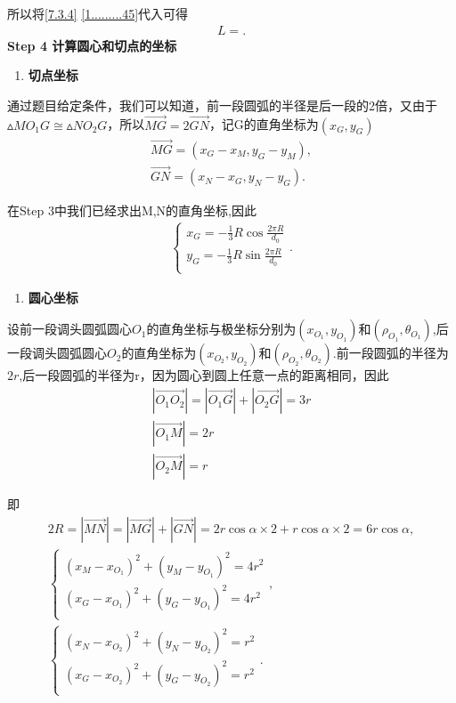\documentclass[../main.tex]{subfiles}
\begin{document}
\par 所以将\eqref{7.3.4} \eqref{1.........45}代入可得
\begin{align}\label{1.........46}
L=.
\end{align}
\noindent\textbf{Step 4 计算圆心和切点的坐标}     
\begin{enumerate}
\item \textbf{切点坐标}
\end{enumerate} 
\par 通过题目给定条件，我们可以知道，前一段圆弧的半径是后一段的2倍，又由于$\vartriangle MO_1G\cong \vartriangle NO_2G$，所以$\vec{MG}=2\vec{GN}$，记G的直角坐标为$(x_{G},y_{G})$
\begin{gather}\label{1.........47}
\overrightarrow{MG}=\left( x_G-x_M,y_G-y_M \right) ,
\\
\overrightarrow{GN}=\left( x_N-x_G,y_N-y_G \right) .
\end{gather}
\par 在Step 3中我们已经求出M,N的直角坐标,因此
\begin{align}\label{1.........48}
\begin{cases}
x_G= -\frac{1}{3}R\cos\frac{2\pi R}{d_0}\\
y_G=-\frac{1}{3}R\sin\frac{2\pi R}{d_0}\\
\end{cases}.
\end{align}
\begin{enumerate}[start=2]
\item \textbf{圆心坐标}
\end{enumerate}   
\par 设前一段调头圆弧圆心$O_1$的直角坐标与极坐标分别为$(x_{O_1},y_{O_1})$和$(\rho_{O_1},\theta_{O_1})$,后一段调头圆弧圆心$O_2$的直角坐标为$(x_{O_2},y_{O_2})$和$(\rho_{O_2},\theta_{O_2})$.前一段圆弧的半径为$2r$,后一段圆弧的半径为r，因为圆心到圆上任意一点的距离相同，因此
\begin{gather}\label{1.........49}
|\overrightarrow{O_1O_2}|= |\overrightarrow{O_1G}| + |\overrightarrow{O_2G}| = 3r\\
|\overrightarrow{O_1M}|=2r   \\
|\overrightarrow{O_2M}|=r
\end{gather}
\par 即
\begin{gather}
2R=\left| \overrightarrow{MN} \right|=\left| \overrightarrow{MG} \right|+\left| \overrightarrow{GN} \right|= 2r\cos\alpha\times2 + r\cos\alpha\times2 = 6r\cos\alpha,
\\
\begin{cases}\label{1.........50}
\left( x_M-x_{O_1} \right) ^2+\left( y_M-y_{O_1} \right) ^2=4r^2\\
\left( x_G-x_{O_1} \right) ^2+\left( y_G-y_{O_1} \right) ^2=4r^2\\
\end{cases},
\\
\begin{cases}\label{1.........51}
\left( x_N-x_{O_2} \right) ^2+\left( y_N-y_{O_2} \right) ^2=r^2\\
\left( x_G-x_{O_2} \right) ^2+\left( y_G-y_{O_2} \right) ^2=r^2\\
\end{cases}.
\end{gather}
\end{document}
